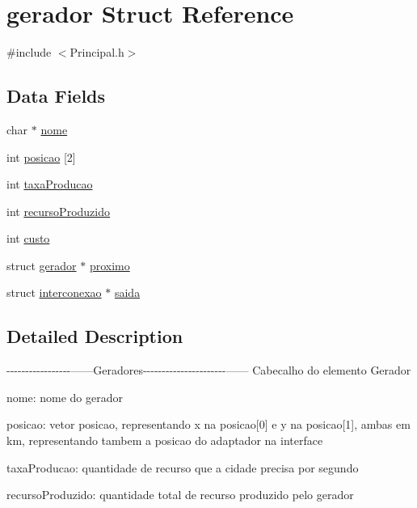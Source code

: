 \hypertarget{structgerador}{\section{gerador Struct Reference}
\label{structgerador}
}


{\ttfamily \#include $<$Principal.\-h$>$}

\subsection*{Data Fields}
\begin{DoxyCompactItemize}
\item 
char $\ast$ \hyperlink{structgerador_ae2a0f66178bb1c4d42e2b70ec9426ccb}{nome}
\item 
int \hyperlink{structgerador_a7e30d633898517077a4363ad6fade5b6}{posicao} \mbox{[}2\mbox{]}
\item 
int \hyperlink{structgerador_ac6d5c20bc66b992b34eaa1ab7bb1d813}{taxa\-Producao}
\item 
int \hyperlink{structgerador_a9e29959680201391763bfe25c54d3e7a}{recurso\-Produzido}
\item 
int \hyperlink{structgerador_a420b800f5434e6488ebc8a2b81d3b74b}{custo}
\item 
struct \hyperlink{structgerador}{gerador} $\ast$ \hyperlink{structgerador_afc2cefcafa0e3935e9e7641ef91e6b2d}{proximo}
\item 
struct \hyperlink{structinterconexao}{interconexao} $\ast$ \hyperlink{structgerador_aafa87c2fb8e43c550b83e0f109c2b7e5}{saida}
\end{DoxyCompactItemize}


\subsection{Detailed Description}
-\/-\/-\/-\/-\/-\/-\/-\/-\/-\/-\/-\/-\/-\/-\/-\/-\/------Geradores-\/-\/-\/-\/-\/-\/-\/-\/-\/-\/-\/-\/-\/-\/-\/-\/-\/-\/-\/-\/-\/-\/------ Cabecalho do elemento Gerador

nome\-: nome do gerador

posicao\-: vetor posicao, representando x na posicao\mbox{[}0\mbox{]} e y na posicao\mbox{[}1\mbox{]}, ambas em km, representando tambem a posicao do adaptador na interface

taxa\-Producao\-: quantidade de recurso que a cidade precisa por segundo

recurso\-Produzido\-: quantidade total de recurso produzido pelo gerador


